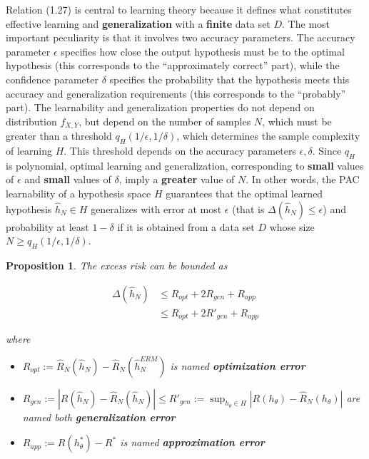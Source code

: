 \documentclass{report}
\newtheorem{proposition}{Proposition}[chapter]
\begin{document}
Relation (1.27) is central to learning theory because it defines what constitutes effective learning and \textbf{generalization} with a \textbf{finite} data set $D$. The most important peculiarity is that it involves two accuracy parameters. The accuracy parameter $\epsilon$ specifies how close the output hypothesis must be to the optimal hypothesis (this corresponds to the “approximately correct” part), while the confidence parameter $\delta$ specifies the probability that the hypothesis meets this accuracy and generalization requirements (this corresponds to the “probably” part). The learnability and generalization properties do not depend on distribution $f_{X,Y}$, but depend on the number of samples $N$, which must be greater than a threshold $q_H(1/\epsilon,1/\delta)$, which determines the sample complexity of learning $H$. This threshold depends on the accuracy parameters $\epsilon,\delta$. Since $q_H$ is polynomial, optimal learning and generalization, corresponding to \textbf{small} values of $\epsilon$ and \textbf{small} values of $\delta$, imply a \textbf{greater} value of $N$. In other words, the PAC learnability of a hypothesis space $H$ guarantees that the optimal learned hypothesis $\hat{h}_N \in H$ generalizes with error at most $\epsilon$ (that is $\Delta(\hat{h}_N) \leq \epsilon$) and probability at least $1-\delta$ if it is obtained from a data set $D$ whose size $N \geq q_H(1/\epsilon,1/\delta)$.

\begin{proposition}
The excess risk can be bounded as

\begin{equation}
\begin{split}
\Delta(\hat{h}_N) & \leq R_{opt} + 2R_{gen} + R_{app}\\
&\leq R_{opt} + 2R'_{gen} + R_{app}
\end{split}
\end{equation}

where

\begin{itemize}
\item $R_{opt} := \hat{R}_N(\hat{h}_N)-\hat{R}_N(\hat{h}^{ERM}_N)$ is named \textbf{optimization error}
\item $R_{gen} := |R(\hat{h}_N)-\hat{R}_N(\hat{h}_N)| \leq R'_{gen} := \sup_{h_{\theta} \in H}|R(h_\theta)-\hat{R}_N(h_\theta)|$ are named both \textbf{generalization error}
\item $R_{app} := R(h^*_\theta)-R^*$ is named \textbf{approximation error}
\end{itemize}
\end{proposition}
\end{document}
